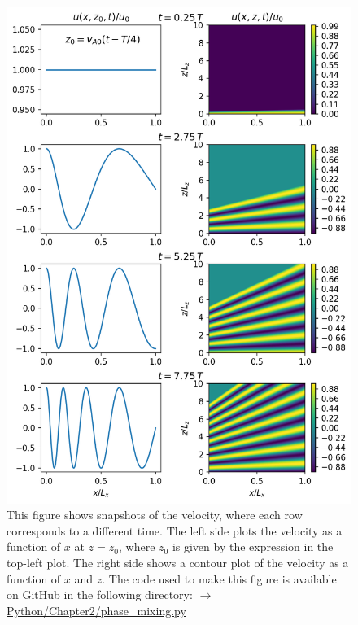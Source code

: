 \begin{figure}
    \centering
    \vspace{-20pt}
    \includegraphics[width=\textwidth,height=0.85\textheight,keepaspectratio]{figures/chapter02/phase_mixing.png}
    \vspace{-10pt}
    \caption{This figure shows snapshots of the velocity, where each row corresponds to a different time. The left side plots the velocity as a function of $x$ at $z=z_0$, where $z_0$ is given by the expression in the top-left plot. The right side shows a contour plot of the velocity as a function of $x$ and $z$. The code used to make this figure is available on GitHub in the following directory:\newline
    \href{https://github.com/aleksyprok/apkp_thesis/blob/main/Python/Chapter2/phase_mixing.py}{$\rightarrow$ Python/Chapter2/phase\_mixing.py}}
    \vspace{-30pt}
    \label{fig:chap_2_phase_mixing}
\end{figure}

